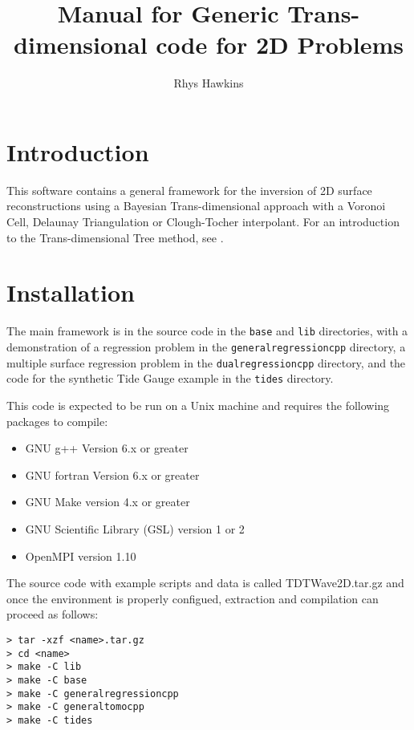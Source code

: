 \documentclass[a4paper,12pt]{article}
\begin{document}
\title{Manual for Generic Trans-dimensional code for 2D Problems}
\author{Rhys Hawkins}

\maketitle

\tableofcontents

\section{Introduction}

This software contains a general framework for the inversion of 2D surface
reconstructions using a Bayesian Trans-dimensional approach with a
Voronoi Cell, Delaunay Triangulation or Clough-Tocher interpolant.
For an introduction to the Trans-dimensional Tree method, see \citet{Hawkins:2018:B}.

\section{Installation}

The main framework is in the source code in the {\tt base} and {\tt lib} directories, with a
demonstration of a regression problem in the {\tt generalregressioncpp} directory,
a multiple surface regression problem in the {\tt dualregressioncpp} directory, and
the code for the synthetic Tide Gauge example in the {\tt tides} directory.

This code is expected to be run on a Unix machine and requires the
following packages to compile:

\begin{itemize}
\item GNU g++ Version 6.x or greater
\item GNU fortran Version 6.x or greater
\item GNU Make version 4.x or greater
\item GNU Scientific Library (GSL) version 1 or 2
\item OpenMPI version 1.10
\end{itemize}

The source code with example scripts and data is called
TDTWave2D.tar.gz and once the environment is properly
configued, extraction and compilation can proceed as follows:

\begin{verbatim}
> tar -xzf <name>.tar.gz
> cd <name>
> make -C lib
> make -C base
> make -C generalregressioncpp
> make -C generaltomocpp 
> make -C tides
\end{verbatim}
\end{document}

